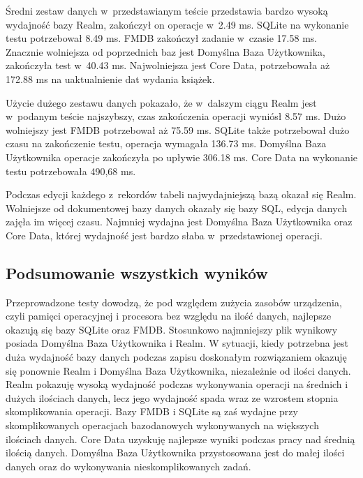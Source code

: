 Średni zestaw danych w~przedstawianym teście przedstawia bardzo wysoką wydajność bazy Realm, zakończył on operacje w~2.49 ms. SQLite na wykonanie testu potrzebował 8.49 ms. FMDB zakończył zadanie w~czasie 17.58 ms. Znacznie wolniejsza od poprzednich baz jest Domyślna Baza Użytkownika, zakończyła test w~40.43 ms. Najwolniejsza jest Core Data, potrzebowała aż 172.88  ms na uaktualnienie dat wydania książek.

Użycie dużego zestawu danych pokazało, że w~dalszym ciągu Realm jest w~podanym teście najszybszy, czas zakończenia operacji wyniósł 8.57 ms. Dużo wolniejszy jest FMDB potrzebował aż 75.59 ms. SQLite także potrzebował dużo czasu na zakończenie testu, operacja wymagała 136.73 ms. Domyślna Baza Użytkownika operacje zakończyła po upływie 306.18 ms. Core Data na wykonanie testu potrzebowała 490,68 ms. 

Podczas edycji każdego z~rekordów tabeli najwydajniejszą bazą okazał się Realm. Wolniejsze od dokumentowej bazy danych okazały się bazy SQL, edycja danych zajęła im więcej czasu. Najmniej wydajna jest Domyślna Baza Użytkownika oraz Core Data, której wydajność jest bardzo słaba w~przedstawionej operacji. 

\subsection{Podsumowanie wszystkich wyników}

Przeprowadzone testy dowodzą, że pod względem zużycia zasobów urządzenia, czyli pamięci operacyjnej i procesora bez względu na ilość danych, najlepsze okazują się bazy SQLite oraz FMDB. Stosunkowo najmniejszy plik wynikowy posiada Domyślna Baza Użytkownika i Realm. W sytuacji, kiedy potrzebna jest duża wydajność bazy danych podczas zapisu doskonałym rozwiązaniem okazuję się ponownie Realm i Domyślna Baza Użytkownika, niezależnie od ilości danych. Realm pokazuję wysoką wydajność podczas wykonywania operacji na średnich i dużych ilościach danych, lecz jego wydajność spada wraz ze wzrostem stopnia skomplikowania operacji. Bazy FMDB i SQLite są zaś wydajne przy skomplikowanych operacjach bazodanowych wykonywanych na większych ilościach danych. Core Data uzyskuję najlepsze wyniki podczas pracy nad średnią ilością danych. Domyślna Baza Użytkownika przystosowana jest do małej ilości danych oraz do wykonywania nieskomplikowanych zadań.
